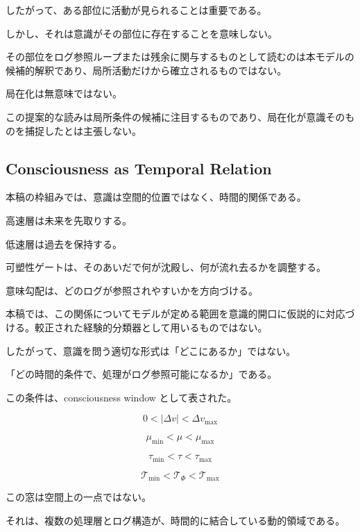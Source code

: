 したがって、ある部位に活動が見られることは重要である。

しかし、それは意識がその部位に存在することを意味しない。

その部位をログ参照ループまたは残余に関与するものとして読むのは本モデルの候補的解釈であり、局所活動だけから確立されるものではない。

局在化は無意味ではない。

この提案的な読みは局所条件の候補に注目するものであり、局在化が意識そのものを捕捉したとは主張しない。

\subsection{Consciousness as Temporal Relation}

本稿の枠組みでは、意識は空間的位置ではなく、時間的関係である。

高速層は未来を先取りする。

低速層は過去を保持する。

可塑性ゲートは、そのあいだで何が沈殿し、何が流れ去るかを調整する。

意味勾配は、どのログが参照されやすいかを方向づける。

本稿では、この関係についてモデルが定める範囲を意識的開口に仮説的に対応づける。較正された経験的分類器として用いるものではない。

したがって、意識を問う適切な形式は「どこにあるか」ではない。

「どの時間的条件で、処理がログ参照可能になるか」である。

この条件は、consciousness window として表された。

\begin{equation}
0 < |\Delta v| < \Delta v_{\max}
\end{equation}

\begin{equation}
\mu_{\min} < \mu < \mu_{\max}
\end{equation}

\begin{equation}
\tau_{\min} < \tau < \tau_{\max}
\end{equation}

\begin{equation}
\mathcal{T}_{\min}
<
\mathcal{T}_{\Phi}
<
\mathcal{T}_{\max}
\end{equation}

この窓は空間上の一点ではない。

それは、複数の処理層とログ構造が、時間的に結合している動的領域である。

